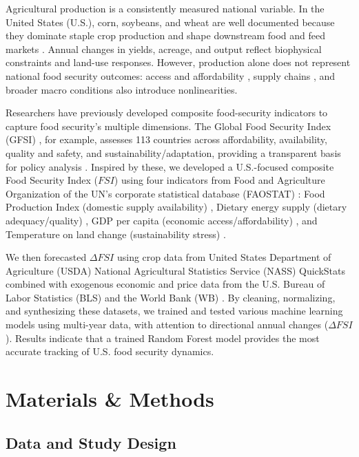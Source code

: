\documentclass[10pt,twocolumn,letterpaper]{article}
\begin{document}
Agricultural production is a consistently measured national variable. In the United States (U.S.), corn, soybeans, and wheat are well documented because they dominate staple crop production and shape downstream food and feed markets \cite{WinnePeersman2016, Kreitzman2020}. Annual changes in yields, acreage, and output reflect biophysical constraints and land-use responses. However, production alone does not represent national food security outcomes: access and affordability \cite{Manap2019}, supply chains \cite{Nava2023, Smith2007}, and broader macro conditions also introduce nonlinearities.

Researchers have previously developed composite food-security indicators to capture food security's multiple dimensions. The Global Food Security Index (GFSI) \cite{GFSI2022, akinniyi2024}, for example, assesses 113 countries across affordability, availability, quality and safety, and sustainability/adaptation, providing a transparent basis for policy analysis \cite{Bibi2023, Salles-Costa2022}. Inspired by these, we developed a U.S.-focused composite Food Security Index ($FSI$) using four indicators from Food and Agriculture Organization of the UN's corporate statistical database (FAOSTAT) \cite{FAOSTATindicator}: Food Production Index (domestic supply availability) \cite{NUBE20011275}, Dietary energy supply (dietary adequacy/quality) \cite{Henchion2017}, GDP per capita (economic access/affordability) \cite{Warr2014}, and Temperature on land change (sustainability stress) \cite{Bozkurt2021}.

We then forecasted $\Delta FSI$ using crop data from United States Department of Agriculture (USDA) National Agricultural Statistics Service (NASS) QuickStats \cite{USDANASS_QuickStats} combined with exogenous economic and price data from the U.S. Bureau of Labor Statistics (BLS) \cite{Varshita2024} and the World Bank (WB) \cite{worldbank2015, worldbank2025}. By cleaning, normalizing, and synthesizing these datasets, we trained and tested various machine learning models using multi-year data, with attention to directional annual changes ($\Delta FSI$). Results indicate that a trained Random Forest model provides the most accurate tracking of U.S. food security dynamics.

\section{Materials \& Methods}

\subsection{Data and Study Design}
\end{document}
